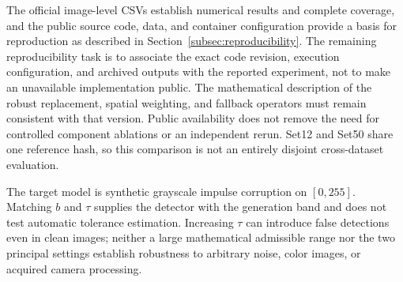 \documentclass[pdflatex,iicol,sn-mathphys-num]{sn-jnl}
\newif\ifshowportuguese
\newcommand{\pt}[1]{\ifshowportuguese\par\begingroup\small\color{blue!55!black}\noindent\textbf{PT: }#1\par\endgroup\fi}
\begin{document}
The official image-level CSVs establish numerical results and complete coverage, and the public source code, data, and container configuration provide a basis for reproduction as described in Section~\ref{subsec:reproducibility}. The remaining reproducibility task is to associate the exact code revision, execution configuration, and archived outputs with the reported experiment, not to make an unavailable implementation public. The mathematical description of the robust replacement, spatial weighting, and fallback operators must remain consistent with that version. Public availability does not remove the need for controlled component ablations or an independent rerun. Set12 and Set50 share one reference hash, so this comparison is not an entirely disjoint cross-dataset evaluation.
\pt{Os CSVs oficiais por imagem estabelecem resultados numéricos e cobertura completa, e o código-fonte, os dados e a configuração de contêiner públicos fornecem uma base para reprodução, conforme descrito na Seção~\ref{subsec:reproducibility}. A tarefa restante de reprodutibilidade é associar a revisão exata do código, a configuração de execução e as saídas arquivadas ao experimento apresentado, não tornar pública uma implementação indisponível. A descrição matemática dos operadores de substituição robusta, ponderação espacial e fallback deve permanecer consistente com essa versão. A disponibilidade pública não elimina a necessidade de ablações controladas de componentes ou de uma reexecução independente. Set12 e Set50 compartilham um hash de referência, de modo que essa comparação não constitui uma avaliação entre conjuntos inteiramente disjuntos.}

The target model is synthetic grayscale impulse corruption on $[0,255]$. Matching $b$ and $\tau$ supplies the detector with the generation band and does not test automatic tolerance estimation. Increasing $\tau$ can introduce false detections even in clean images; neither a large mathematical admissible range nor the two principal settings establish robustness to arbitrary noise, color images, or acquired camera processing.
\pt{O modelo alvo é corrupção impulsiva sintética em tons de cinza em $[0,255]$. Igualar $b$ e $\tau$ fornece ao detector a faixa de geração e não testa a estimação automática da tolerância. Aumentar $\tau$ pode introduzir falsas detecções mesmo em imagens limpas; nem uma ampla faixa matemática admissível nem as duas configurações principais estabelecem robustez a ruído arbitrário, imagens coloridas ou processamento adquirido por câmeras.}
\end{document}
